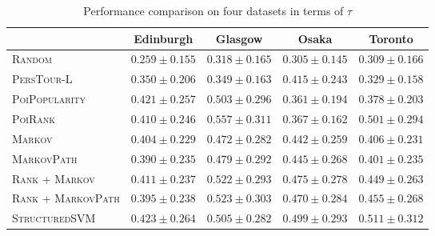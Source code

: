 \begin{table*}
\centering
\begin{tabular}{l|cccc} \hline
 & Edinburgh & Glasgow & Osaka & Toronto \\ \hline
\textsc{Random} & $0.259\pm0.155$ & $0.318\pm0.165$ & $0.305\pm0.145$ & $0.309\pm0.166$ \\
\textsc{PersTour-L} & $0.350\pm0.206$ & $0.349\pm0.163$ & $0.415\pm0.243$ & $0.329\pm0.158$ \\
\textsc{PoiPopularity} & $\mathit{0.421\pm0.257}$ & $0.503\pm0.296$ & $0.361\pm0.194$ & $0.378\pm0.203$ \\
\textsc{PoiRank} & $0.410\pm0.246$ & $\mathbf{0.557\pm0.311}$ & $0.367\pm0.162$ & $\mathit{0.501\pm0.294}$ \\
\textsc{Markov} & $0.404\pm0.229$ & $0.472\pm0.282$ & $0.442\pm0.259$ & $0.406\pm0.231$ \\
\textsc{MarkovPath} & $0.390\pm0.235$ & $0.479\pm0.292$ & $0.445\pm0.268$ & $0.401\pm0.235$ \\
\textsc{Rank} + \textsc{Markov} & $0.411\pm0.237$ & $0.522\pm0.293$ & $\mathit{0.475\pm0.278}$ & $0.449\pm0.263$ \\
\textsc{Rank} + \textsc{MarkovPath} & $0.395\pm0.238$ & $\mathit{0.523\pm0.303}$ & $0.470\pm0.284$ & $0.455\pm0.268$ \\
\textsc{StructuredSVM} & $\mathbf{0.423\pm0.264}$ & $0.505\pm0.282$ & $\mathbf{0.499\pm0.293}$ & $\mathbf{0.511\pm0.312}$ \\
\hline
\end{tabular}
\caption{Performance comparison on four datasets in terms of $\tau$}
\label{table:tau}
\end{table*}


